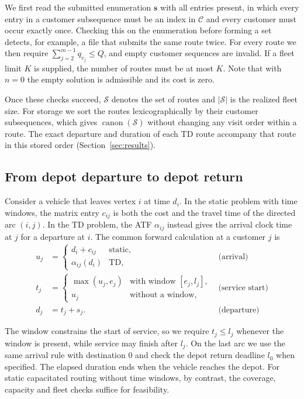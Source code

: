 We first read the submitted enumeration $\mathbf s$ with all entries present, in which every entry in a customer subsequence must be an index in $\mathcal C$ and every customer must occur exactly once. Checking this on the enumeration before forming a set detects, for example, a file that submits the same route twice. For every route we then require $\sum_{j=2}^{m-1}q_{v_j}\leq Q$, and empty customer sequences are invalid. If a fleet limit $K$ is supplied, the number of routes must be at most $K$. Note that with $n=0$ the empty solution is admissible and its cost is zero.

Once these checks succeed, $\mathcal S$ denotes the set of routes and $|\mathcal S|$ is the realized fleet size. For storage we sort the routes lexicographically by their customer subsequences, which gives $\operatorname{canon}(\mathcal S)$ without changing any visit order within a route. The exact departure and duration of each TD route accompany that route in this stored order (Section~\ref{sec:results}).

\subsection{From depot departure to depot return}

Consider a vehicle that leaves vertex $i$ at time $d_i$. In the static problem with time windows, the matrix entry $c_{ij}$ is both the cost and the travel time of the directed arc $(i,j)$. In the TD problem, the ATF $\alpha_{ij}$ instead gives the arrival clock time at $j$ for a departure at $i$. The common forward calculation at a customer $j$ is
\begin{align*}
 u_j &= \begin{cases} d_i+c_{ij} & \text{static},\\ \alpha_{ij}(d_i) & \text{TD},\end{cases} & \text{(arrival)}\\
 t_j &= \begin{cases} \max(u_j,e_j) & \text{with window }[e_j,l_j],\\ u_j & \text{without a window},\end{cases} & \text{(service start)}\\
 d_j &= t_j+s_j. & \text{(departure)}
\end{align*}

The window constrains the start of service, so we require $t_j\leq l_j$ whenever the window is present, while service may finish after $l_j$. On the last arc we use the same arrival rule with destination $0$ and check the depot return deadline $l_0$ when specified. The elapsed duration ends when the vehicle reaches the depot. For static capacitated routing without time windows, by contrast, the coverage, capacity and fleet checks suffice for feasibility.

